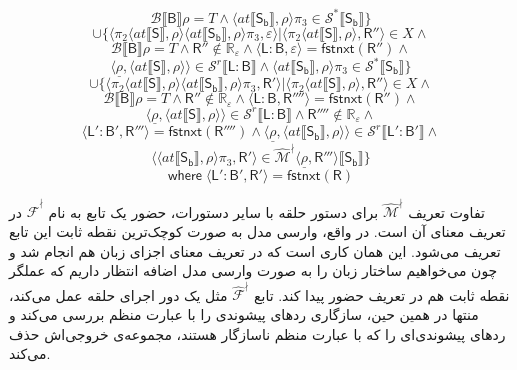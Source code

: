 $$\mathcal{B}\llbracket \mathsf{B} \rrbracket \rho = \mathit{T}\land \langle at \llbracket \mathsf{S_b} \rrbracket , \rho \rangle \pi_3 \in \mathcal{S}^* \llbracket \mathsf{S_b} \rrbracket \}$$
$$\cup\{\langle \pi_2 \langle at \llbracket \mathsf{S} \rrbracket , \rho \rangle \langle at \llbracket \mathsf{S_b} \rrbracket , \rho \rangle \pi_3 , \varepsilon \rangle | \langle \pi_2 \langle at \llbracket \mathsf{S} \rrbracket , \rho \rangle , \mathsf{R''} \rangle \in X \land$$
$$\mathcal{B} \llbracket \mathsf{B} \rrbracket \rho = \mathit{T} \land \mathsf{R''} \notin \mathbb{R_\varepsilon} \land \langle \mathsf{L:B} , \varepsilon \rangle = \mathsf{fstnxt(R'')} \land$$	
$$\langle \underline{\rho} ,\langle at \llbracket \mathsf{S} \rrbracket, \rho \rangle \rangle \in \mathcal{S}^r \llbracket \mathsf{L:B} \rrbracket \land \langle at \llbracket \mathsf{S_b} \rrbracket , \rho \rangle \pi_3 \in \mathcal{S}^* \llbracket \mathsf{S_b} \rrbracket\}$$ 
$$\cup \{ \langle \pi_2 \langle at \llbracket \mathsf{S} \rrbracket , \rho \rangle \langle at \llbracket \mathsf{S_b} \rrbracket , \rho \rangle \pi_3 , \mathsf{R'} \rangle | \langle \pi_2 \langle at \llbracket \mathsf{S} \rrbracket , \rho \rangle , \mathsf{R''} \rangle \in X \land$$
$$\mathcal{B} \llbracket \mathsf{B} \rrbracket \rho = \mathit{T} \land \mathsf{R''} \notin \mathbb{R_\varepsilon} \land \langle \mathsf{L:B,R''''} \rangle = \mathsf{fstnxt(R'')} \land$$
$$\langle \underline{\rho} , \langle at \llbracket \mathsf{S}\rrbracket , \rho \rangle \rangle \in \mathcal{S}^r \llbracket \mathsf{L:B} \rrbracket \land \mathsf{R''''} \notin \mathbb{R_\varepsilon} \land$$
$$\langle \mathsf{L':B',R'''} \rangle = \mathsf{fstnxt(R'''')} \land \langle \underline{\rho} , \langle at \llbracket \mathsf{S_b}\rrbracket , \rho \rangle \rangle \in \mathcal{S}^r \llbracket \mathsf{L':B'} \rrbracket \land$$
$$\langle \langle at \llbracket \mathsf{S_b} \rrbracket, \rho \rangle \pi_3 , \mathsf{R'} \rangle \in \mathcal{\hat{M}^\nmid} \langle \underline{\rho} , \mathsf{R'''} \rangle \llbracket \mathsf{S_b} \rrbracket \}$$
$$ \mathsf{where \; \langle L':B' , R' \rangle = fstnxt(R)}$$

تفاوت تعریف 
$\mathcal{\hat{M}}^\nmid$
 برای دستور حلقه با سایر دستورات، حضور یک تابع به نام $\mathcal{\hat{F}^\nmid}$ در تعریف معنای آن است. در واقع، وارسی مدل به صورت کوچک‌ترین نقطه ثابت این تابع تعریف می‌شود. این همان کاری است که در تعریف معنای اجزای زبان هم انجام شد و چون می‌خواهیم ساختار زبان را به صورت وارسی مدل اضافه انتظار داریم که عملگر نقطه ثابت هم در تعریف حضور پیدا کند. تابع $\mathcal{\hat{F}^\nmid}$ مثل یک دور اجرای حلقه‌ عمل می‌کند، منتها در همین حین، سازگاری ردهای پیشوندی را با عبارت منظم بررسی می‌کند و ردهای پیشوندی‌ای را که با عبارت منظم ناسازگار هستند، مجموعه‌ی خروجی‌اش حذف می‌کند.


